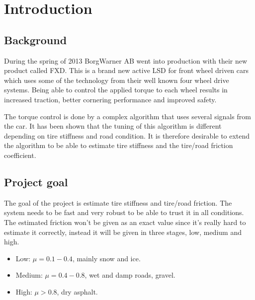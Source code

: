 \chapter{Introduction}

\section{Background}
During the spring of 2013 BorgWarner AB went into production with their new product called FXD. This is a brand new active LSD for front wheel driven cars which uses some of the technology from their well known four wheel drive systems. Being able to control the applied torque to each wheel results in increased traction, better cornering performance and improved safety.

The torque control is done by a complex algorithm that uses several signals from the car. It has been shown that the tuning of this algorithm is different depending on tire stiffness and road condition. It is therefore desirable to extend the algorithm to be able to estimate tire stiffness and the tire/road friction coefficient.


\section{Project goal}
The goal of the project is estimate tire stiffness and tire/road friction. The system needs to be fast and very robust to be able to trust it in all conditions. The estimated friction won't be given as an exact value since it's really hard to estimate it correctly, instead it will be given in three stages, low, medium and high.

\begin{itemize}
	\item Low: $ \mu = 0.1-0.4 $, mainly snow and ice.
	\item Medium: $ \mu = 0.4-0.8 $, wet and damp roads, gravel.
	\item High: $ \mu > 0.8 $, dry asphalt.
\end{itemize}
